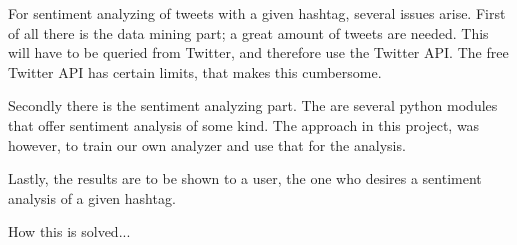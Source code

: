 \documentclass[Main]{subfiles}
\begin{document}
For sentiment analyzing of tweets with a given hashtag, several issues arise. First of all there is the data mining part; a great amount of tweets are needed. This will have to be queried from Twitter, and therefore use the Twitter API. The free Twitter API has certain limits, that makes this cumbersome. 

Secondly there is the sentiment analyzing part. The are several python modules that offer sentiment analysis of some kind. The approach in this project, was however, to train our own analyzer and use that for the analysis. 

Lastly, the results are to be shown to a user, the one who desires a sentiment analysis of a given hashtag. 


How this is solved...
\end{document}
